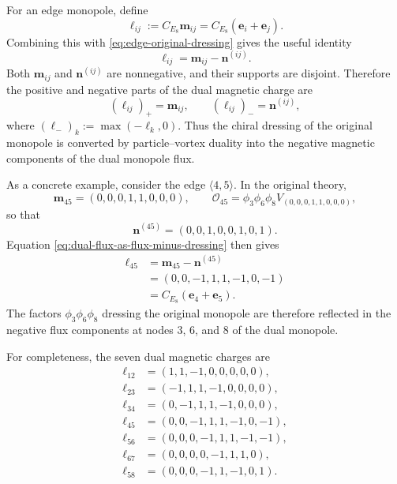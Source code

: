 \documentclass[11pt,a4paper]{article}
\numberwithin{equation}{section}
\begin{document}
For an edge monopole, define
\begin{equation}
  \boldsymbol\ell_{ij}
  :=C_{E_8}\boldsymbol m_{ij}
  =C_{E_8}(\boldsymbol e_i+\boldsymbol e_j).
  \label{eq:dual-edge-flux}
\end{equation}
Combining this with \eqref{eq:edge-original-dressing} gives the useful identity
\begin{equation}
  \boldsymbol\ell_{ij}
  =\boldsymbol m_{ij}-\boldsymbol n^{(ij)}.
  \label{eq:dual-flux-as-flux-minus-dressing}
\end{equation}
Both $\boldsymbol m_{ij}$ and $\boldsymbol n^{(ij)}$ are nonnegative, and their supports are disjoint.  Therefore the positive and negative parts of the dual magnetic charge are
\begin{equation}
  (\boldsymbol\ell_{ij})_+
  =\boldsymbol m_{ij},
  \qquad
  (\boldsymbol\ell_{ij})_-
  =\boldsymbol n^{(ij)},
  \label{eq:dual-flux-positive-negative}
\end{equation}
where $(\ell_-)_k:=\max(-\ell_k,0)$.  Thus the chiral dressing of the original monopole is converted by particle--vortex duality into the negative magnetic components of the dual monopole flux.

As a concrete example, consider the edge $\langle4,5\rangle$.  In the original theory,
\begin{equation}
  \boldsymbol m_{45}
  =(0,0,0,1,1,0,0,0),
  \qquad
  \mathcal O_{45}
  =\phi_3\phi_6\phi_8
  V_{(0,0,0,1,1,0,0,0)},
  \label{eq:O45-example}
\end{equation}
so that
\begin{equation}
  \boldsymbol n^{(45)}
  =(0,0,1,0,0,1,0,1).
  \label{eq:O45-dressing-example}
\end{equation}
Equation \eqref{eq:dual-flux-as-flux-minus-dressing} then gives
\begin{equation}
  \begin{aligned}
  \boldsymbol\ell_{45}
  &=\boldsymbol m_{45}-\boldsymbol n^{(45)}\\
  &=(0,0,-1,1,1,-1,0,-1)\\
  &=C_{E_8}(\boldsymbol e_4+\boldsymbol e_5).
  \end{aligned}
  \label{eq:O45-dual-flux-example}
\end{equation}
The factors $\phi_3\phi_6\phi_8$ dressing the original monopole are therefore reflected in the negative flux components at nodes $3$, $6$, and $8$ of the dual monopole.

For completeness, the seven dual magnetic charges are
\begin{align}
\boldsymbol\ell_{12}&=(1,1,-1,0,0,0,0,0),\nonumber\\
\boldsymbol\ell_{23}&=(-1,1,1,-1,0,0,0,0),\nonumber\\
\boldsymbol\ell_{34}&=(0,-1,1,1,-1,0,0,0),\nonumber\\
\boldsymbol\ell_{45}&=(0,0,-1,1,1,-1,0,-1),\nonumber\\
\boldsymbol\ell_{56}&=(0,0,0,-1,1,1,-1,-1),\nonumber\\
\boldsymbol\ell_{67}&=(0,0,0,0,-1,1,1,0),\nonumber\\
\boldsymbol\ell_{58}&=(0,0,0,-1,1,-1,0,1).
\label{eq:seven-dual-fluxes}
\end{align}
\end{document}
